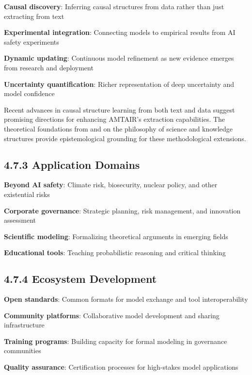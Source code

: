 \documentclass[
  11pt,
  letterpaper,
  openany]{book}
\begin{document}
\textbf{Causal discovery}: Inferring causal structures from data rather
than just extracting from text

\textbf{Experimental integration}: Connecting models to empirical
results from AI safety experiments

\textbf{Dynamic updating}: Continuous model refinement as new evidence
emerges from research and deployment

\textbf{Uncertainty quantification}: Richer representation of deep
uncertainty and model confidence

Recent advances in causal structure learning from both text and data
\textcite{babakov2025} \textcite{ban2023} \textcite{bethard2007}
\textcite{chen2023} \textcite{heinze-deml2018} \textcite{squires2023}
\textcite{yang2022} suggest promising directions for enhancing AMTAIR's
extraction capabilities. The theoretical foundations from
\textcite{duhem1954} and \textcite{meyer2022b} on the philosophy of
science and knowledge structures provide epistemological grounding for
these methodological extensions.

\subsection{4.7.3 Application Domains}\label{sec-application-future}

\textbf{Beyond AI safety}: Climate risk, biosecurity, nuclear policy,
and other existential risks

\textbf{Corporate governance}: Strategic planning, risk management, and
innovation assessment

\textbf{Scientific modeling}: Formalizing theoretical arguments in
emerging fields

\textbf{Educational tools}: Teaching probabilistic reasoning and
critical thinking

\subsection{4.7.4 Ecosystem Development}\label{sec-ecosystem-future}

\textbf{Open standards}: Common formats for model exchange and tool
interoperability

\textbf{Community platforms}: Collaborative model development and
sharing infrastructure

\textbf{Training programs}: Building capacity for formal modeling in
governance communities

\textbf{Quality assurance}: Certification processes for high-stakes
model applications
\end{document}
